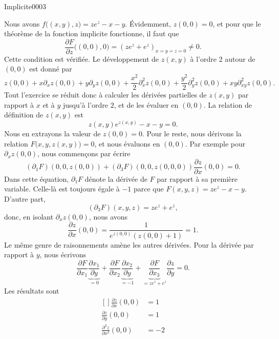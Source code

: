 
\begin{corrige}{Implicite0003}

	Nous avons $f\big( (x,y),z \big)=ze^z-x-y$. Évidemment, $z(0,0)=0$, et pour que le théorème de la fonction implicite fonctionne, il faut que
	\begin{equation}
		\frac{ \partial F }{ \partial z }\big( (0,0),0 \big)=(ze^z+e^z)_{x=y=z=0}\neq 0.
	\end{equation}
	Cette condition est vérifiée. Le développement de $z(x,y)$ à l'ordre $2$ autour de $(0,0)$ est donné par
	\begin{equation}
		z(0,0)+x\partial_xz(0,0)+y\partial_yz(0,0)+\frac{x^2}{ 2 }\partial^2_xz(0,0)+\frac{ y^2 }{ 2 }\partial^2_yz(0,0)+xy\partial^2_{xy}z(0,0).
	\end{equation}
	Tout l'exercice se réduit donc à calculer les dérivées partielles de $z(x,y)$ par rapport à $x$ et à $y$ jusqu'à l'ordre $2$, et de les évaluer en $(0,0)$.
	La relation de définition de $z(x,y)$ est
	\begin{equation}		\label{EqDefZxyImpII}
		z(x,y)e^{z(x,y)}-x-y=0.
	\end{equation}
	Nous en extrayons la valeur de $z(0,0)=0$. Pour le reste, nous dérivons la relation $F\big( x,y,z(x,y) \big)=0$, et nous évaluons en $(0,0)$. Par exemple pour $\partial_xz(0,0)$, nous commençons par écrire
	\begin{equation}
		(\partial_1F)(0,0,z(0,0))+(\partial_3F)(0,0,z(0,0,0))\frac{ \partial z }{ \partial x }(0,0)=0.
	\end{equation}
	Dans cette équation, $\partial_1F$ dénote la dérivée de $F$ par rapport à sa première variable. Celle-là est toujours égale à $-1$ parce que $F(x,y,z)=ze^z-x-y$. D'autre part,
	\begin{equation}
		(\partial_3F)(x,y,z)=ze^z+e^z,
	\end{equation}
	donc, en isolant $\partial_xz(0,0)$, nous avons
	\begin{equation}
		\frac{ \partial z }{ \partial x }(0,0)=\frac{1}{ e^{z(0,0)}(z(0,0)+1) }=1.
	\end{equation}
	Le même genre de raisonnements amène les autres dérivées. Pour la dérivée par rapport à $y$, nous écrivons
	\begin{equation}
		\frac{ \partial F }{ \partial x_1 } \underbrace{\frac{ \partial x_1 }{ \partial y }}_{=0}+\frac{ \partial F }{ \partial x_2 }\underbrace{\frac{ \partial x_2 }{ \partial y }}_{=-1}+\underbrace{\frac{ \partial F }{ \partial x_3 }}_{=ze^z+e^z}\frac{ \partial z }{ \partial y }=0.
	\end{equation}
	Les résultats sont
	\begin{equation}
		\begin{aligned}[]
			\frac{ \partial z }{ \partial x }(0,0)&=1\\
			\frac{ \partial z }{ \partial y }(0,0)&=1\\
			\frac{ \partial^2 z }{ \partial x^2 }(0,0)&=-2
		\end{aligned}
	\end{equation}
\end{corrige}
